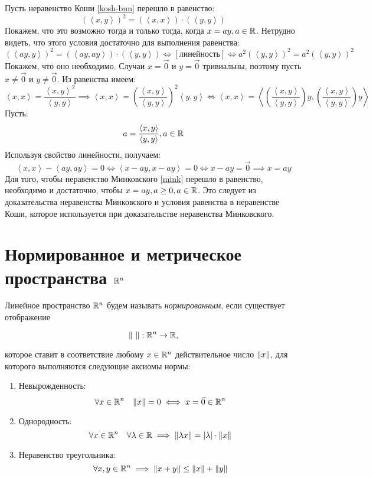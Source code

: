 \documentclass[../../main.tex]{subfiles}
\begin{document}
\begin{eans}
 Пусть неравенство Коши \eqref{kosh-bun} перешло в равенство:
 \[ (\left<x, y\right>)^2 = \left(\left<x, x\right>\right) 
 \cdot \left(\left<y, y\right>\right) \]
 Покажем, что это возможно тогда и только тогда, когда $x = ay,
 a \in \mathbb{R}$. Нетрудно видеть, что этого условия достаточно для
 выполнения равенства:
 \[ (\left<ay, y\right>)^2 = \left(\left<ay, ay\right>\right) 
 \cdot \left(\left<y, y\right>\right) \iff \left[
 \text{линейность}\right] \iff a^2 (\left<y, y\right>)^2 = 
 a^2 (\left<y, y\right>)^2 \]
 Покажем, что оно необходимо. Случаи $x = \vec{0}$ и $y = \vec{0}$
 тривиальны, поэтому пусть $x \neq \vec{0}$ и $y \neq \vec{0}$. 
 Из равенства имеем:
 \[\left<x, x\right> = \frac{\left<x, y\right>^2}{\left<y, y\right>}
 \implies \left<x, x\right> = \left(\frac{\left<x, y\right>}
 {\left<y, y\right>}\right)^2 \left<y, y\right> \iff \left<x, x\right>
 = \left<\left(\frac{\left<x, y\right>}{\left<y, y\right>}\right) y, 
 \left(\frac{\left<x, y\right>}{\left<y, y\right>}\right) y\right> \]
 Пусть:
 \[a = \frac{\left<x, y\right>}{\left<y, y\right>}, a \in \mathbb{R} \]
 Используя свойство линейности, получаем:
 \[\left<x, x\right> - \left<ay, ay\right> = 0 \iff \left<x - ay,
 x - ay\right> = 0 \iff x - ay = \vec{0} \implies x = ay\]
 Для того, чтобы неравенство Минковского \eqref{mink} перешло в
 равенство, необходимо и достаточно, чтобы $x = ay, a \geq 0, a \in \mathbb{R}$. Это следует из доказательства неравенства Минковского и условия равенства в неравенстве Коши, которое используется при доказательстве неравенства Минковского.
\end{eans}

\section{Нормированное и метрическое пространства $\mathbb{R}^n$}

Линейное пространство $\mathbb{R}^n$ будем называть 
\textit{нормированным}, если существует отображение

\begin{equation}
 \label{norm-disp}
 \lVert\ \rVert: \mathbb{R}^n \to \mathbb{R},
\end{equation}

которое ставит в соответствие любому $x \in \mathbb{R}^n$ действительное 
число $\lVert{x}\rVert$, для которого выполняются следующие аксиомы нормы:

\begin{enumerate}
 \item Невырожденность:
 \[\forall x \in \mathbb{R}^n \quad \lVert{x}\rVert = 0 \iff x = \vec 0 \in \mathbb{R}^n\]
 \item Однородность:
 \[\forall x \in \mathbb{R}^n \quad \forall \lambda \in \mathbb{R} \implies 
   \lVert{\lambda x}\rVert = \left|{\lambda}\right| \cdot \lVert{x}\rVert\]
 \item Неравенство треугольника:
 \[\forall x, y \in \mathbb{R}^n \implies \lVert{x+y}\rVert \le \lVert{x}\rVert + \lVert{y}\rVert\]
\end{enumerate}
\end{document}
